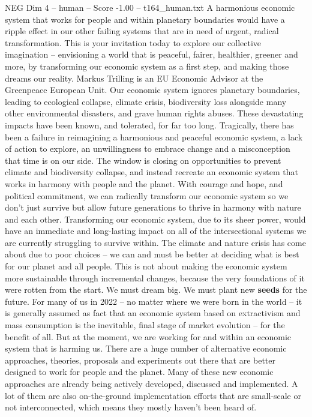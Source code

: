 \begin{textsample}{NEG Dim 4 – human – Score -1.00 – t164\_human.txt}
A harmonious economic system that works for people and within planetary boundaries would have a ripple effect in our other failing systems that are in need of urgent, radical transformation.
This is your invitation today to explore our collective imagination – envisioning a world that is peaceful, fairer, healthier, greener and more, by transforming our economic system as a first step, and making those dreams our reality.
Markus Trilling is an EU Economic Advisor at the Greenpeace European Unit.
Our economic system ignores planetary boundaries, leading to ecological collapse, climate crisis, biodiversity loss alongside many other environmental disasters, and grave human rights abuses.
These devastating impacts have been known, and tolerated, for far too long.
Tragically, there has been a failure in reimagining a harmonious and peaceful economic system, a lack of action to explore, an unwillingness to embrace change and a misconception that time is on our side.
The window is closing on opportunities to prevent climate and biodiversity collapse, and instead recreate an economic system that works in harmony with people and the planet.
With courage and hope, and political commitment, we can radically transform our economic system so we don't just survive but allow future generations to thrive in harmony with nature and each other.
Transforming our economic system, due to its sheer power, would have an immediate and long-lasting impact on all of the intersectional systems we are currently struggling to survive within.
The climate and nature crisis has come about due to poor choices – we can and must be better at deciding what is best for our planet and all people.
This is not about making the economic system more sustainable through incremental changes, because the very foundations of it were rotten from the start.
We must dream big.
We must plant new \textbf{seeds} for the future.
For many of us in 2022 – no matter where we were born in the world – it is generally assumed as fact that an economic system based on extractivism and mass consumption is the inevitable, final stage of market evolution – for the benefit of all.
But at the moment, we are working for and within an economic system that is harming us.
There are a huge number of alternative economic approaches, theories, proposals and experiments out there that are better designed to work for people and the planet.
Many of these new economic approaches are already being actively developed, discussed and implemented.
A lot of them are also on-the-ground implementation efforts that are small-scale or not interconnected, which means they mostly haven't been heard of.

\end{textsample}
